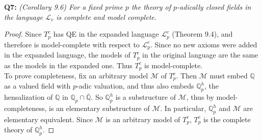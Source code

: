 \documentclass{article}
\begin{document}
\textbf{Q7:} \it (Corollary 9.6) For a fixed prime $p$ the theory of
  $p$-adically closed fields in the language $\mathcal{L}_v$ is complete
  and model complete.

  \begin{proof}
    Since $T_p^c$ has QE in the expanded language $\mathcal{L}_p^c$
    (Theorem 9.4), and therefore is model-complete with respect to
    $\mathcal{L}_p^c$. Since no new axioms were added in the expanded
    language, the models of $T_p^c$ in the original language are the same
    as the models in the expanded one. Thus $T_p^c$ is model-complete. \\

    To prove completeness, fix an arbitrary model $\mathcal{M}$ of $T_p^c$.
    Then $\mathcal{M}$ must embed $\mathbb{Q}$ as a valued field with
    $p$-adic valuation, and thus also embeds $\mathbb{Q}_p^h$, the
    hensalization of $\mathbb{Q}$ in $\mathbb{Q}_p\cap\bar{\mathbb{Q}}$. So
    $\mathbb{Q}_p^h$ is a substructure of $\mathcal{M}$, thus by
    model-completeness, is an elementary substructure of $\mathcal{M}$. In
    particular, $\mathbb{Q}_p^h$ and $\mathcal{M}$ are elementary
    equivalent. Since $\mathcal{M}$ is an arbitrary model of $T_p^c$,
    $T_p^c$ is the complete theory of $\mathbb{Q}_p^h$.
  \end{proof}
\end{document}
